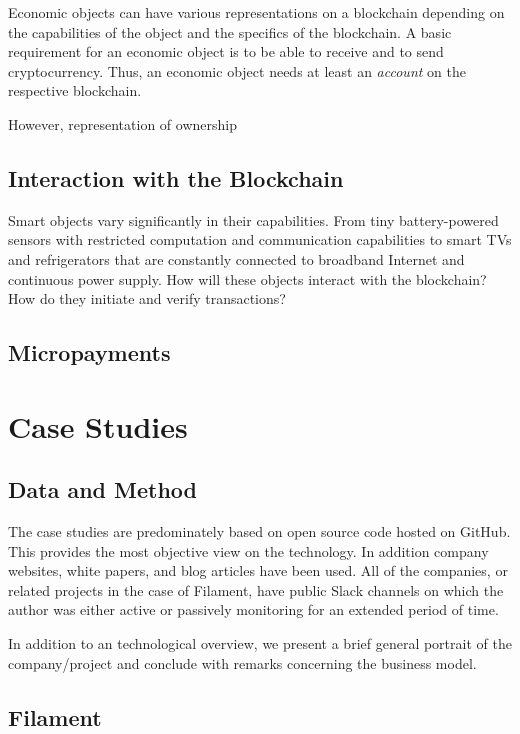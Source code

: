 Economic objects can have various representations on a blockchain depending on the capabilities of the object and the specifics of the blockchain. A basic requirement for an economic object is to be able to receive and to send cryptocurrency. Thus, an economic object needs at least an \emph{account} on the respective blockchain.

However, representation of ownership 

\subsection{Interaction with the Blockchain}

Smart objects vary significantly in their capabilities. From tiny battery-powered sensors with restricted computation and communication capabilities to smart TVs and refrigerators that are constantly connected to broadband Internet and continuous power supply. How will these objects interact with the blockchain? How do they initiate and verify transactions? 

\subsection{Micropayments}


\section{Case Studies}

\subsection{Data and Method}

The case studies are predominately based on open source code hosted on GitHub. This provides the most objective view on the technology. In addition company websites, white papers, and blog articles have been used. All of the companies, or related projects in the case of Filament, have public Slack channels on which the author was either active or passively monitoring for an extended period of time.

In addition to an technological overview, we present a brief general portrait of the company/project and conclude with remarks concerning the business model. 

\subsection{Filament}

